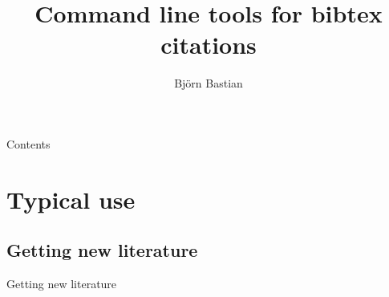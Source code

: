 \documentclass[xcolor={table,dvipsnames}]{beamer}
\author{Björn Bastian}
\title[Citation tools]{Command line tools for bibtex citations}
\newcommand{\bashcmd}[2][-0.6\baselineskip]{%
  \vspace{#1}%
}
\newcommand{\bashout}[2][-0.1\baselineskip]{%
  \vspace{#1}%
}
\begin{document}
\begin{frame}[plain]
  \titlepage
\end{frame}

\begin{frame}{Contents}
  \tableofcontents
\end{frame}

\section{Typical use}

\subsection{Getting new literature}
\begin{frame}{Getting new literature}
  \begin{minipage}[t]{.6\textwidth}
    \vspace{-0.6\baselineskip}
    \uncover<1->{\bashcmd{cmdline/new/d1-1-in.txt}}%
    \uncover<1->{\bashout{cmdline/new/d1-1-out.txt}}%
    \uncover<3->{\bashcmd{cmdline/new/d1-2-in.txt}}%
    \uncover<3->{\bashout{cmdline/new/d1-2-out.txt}}%
    \uncover<4->{\bashcmd{cmdline/new/d1-3-in.txt}}%
    \uncover<4->{\bashout{cmdline/new/d1-3-out.txt}}%
  \end{minipage}%
  \hfill%
  \begin{minipage}[t]{.34\textwidth}
    \hbox{\;}

\end{minipage}
\end{frame}
\end{document}
